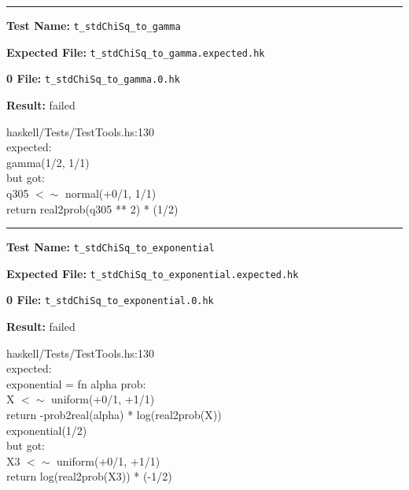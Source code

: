 \documentclass[11pt]{article}
\begin{document}
\hrule

\bigskip
\textbf{Test Name:} {\tt t\_stdChiSq\_to\_gamma}

\textbf{Expected File:} {\tt t\_stdChiSq\_to\_gamma.expected.hk}

\bigskip


\bigskip
\textbf{0 File:} {\tt t\_stdChiSq\_to\_gamma.0.hk}

\bigskip


\bigskip
\textbf{Result:} failed

\bigskip
\noindent


\bigskip
\noindent
haskell/Tests/TestTools.hs:130\\expected:\\gamma(1/2, 1/1)\\but got:\\q305 $<\sim$ normal(+0/1, 1/1)\\return real2prob(q305 ** 2) * (1/2)\\

\hrule

\bigskip
\textbf{Test Name:} {\tt t\_stdChiSq\_to\_exponential}

\textbf{Expected File:} {\tt t\_stdChiSq\_to\_exponential.expected.hk}

\bigskip


\bigskip
\textbf{0 File:} {\tt t\_stdChiSq\_to\_exponential.0.hk}

\bigskip


\bigskip
\textbf{Result:} failed

\bigskip
\noindent
haskell/Tests/TestTools.hs:130\\expected:\\exponential = fn alpha prob:\\              X $<\sim$ uniform(+0/1, +1/1)\\              return -prob2real(alpha) * log(real2prob(X))\\exponential(1/2)\\but got:\\X3 $<\sim$ uniform(+0/1, +1/1)\\return log(real2prob(X3)) * (-1/2)\\
\end{document}
